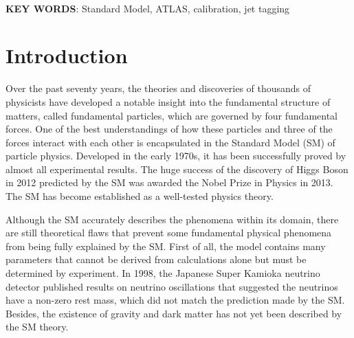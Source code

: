 \documentclass[UTF8,12pt]{ctexart}
\numberwithin{equation}{section}
\renewcommand{\rm}{\mathrm}
\def\vs{\vspace*{1mm}}
\begin{document}




~\\ 
\textbf{KEY WORDS}: 
Standard Model, ATLAS, calibration, jet tagging


\newpage 


\begin{center}

\renewcommand\contentsname{\textbf{Contents}}


\tableofcontents\thispagestyle{fancy}


\end{center}


\newpage
{}

\pagestyle{fancy}
\fancyhf{}
\cfoot{$\bm{-\thepage-}$}




\section{Introduction}
\label{sec:1}


\hspace{8mm}
Over the past seventy years, the theories and discoveries of thousands of physicists have developed a notable insight into the fundamental structure of matters, called fundamental particles, which are governed by four fundamental forces. One of the best understandings of how these particles and three of the forces interact with each other is encapsulated in the Standard Model (SM) of particle physics. Developed in the early 1970s, it has been successfully proved by almost all experimental results. The huge success of the discovery of Higgs Boson in 2012 predicted by the SM was awarded the Nobel Prize in Physics in 2013. The SM has become established as a well-tested physics theory.

Although the SM accurately describes the phenomena within its domain, there are still theoretical flaws that prevent some fundamental physical phenomena from being fully explained by the SM. First of all, the model contains many parameters that cannot be derived from calculations alone but must be determined by experiment. 
In 1998, the Japanese Super Kamioka neutrino detector published results on neutrino oscillations that suggested the neutrinos have a non-zero rest mass, which did not match the prediction made by the SM. Besides, the existence of gravity and dark matter has not yet been described by the SM theory.
\end{document}
